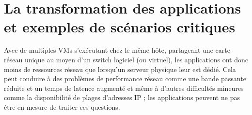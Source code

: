 \section{La transformation des applications et exemples de scénarios critiques}

Avec de multiples VMs s'exécutant chez le même hôte, partageant une carte réseau unique au moyen d'un switch logiciel (ou virtuel), les applications ont donc moins de ressources réseau que lorsqu'un serveur physique leur est dédié. Cela peut conduire à des problèmes de performance réseau comme une bande passante réduite et un temps de latence augmenté et même à d'autres difficultés mineures comme la disponibilité de plages d'adresses IP ; les applications peuvent ne pas être en mesure de traiter ces questions.





